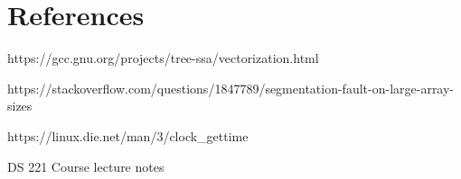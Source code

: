 \documentclass[11pt,a4paper,oneside]{article}
\begin{document}
    \section{References}
    
    \begin{list}{*}{}
    	\item https://gcc.gnu.org/projects/tree-ssa/vectorization.html
    	\item https://stackoverflow.com/questions/1847789/segmentation-fault-on-large-array-sizes
    	\item https://linux.die.net/man/3/clock\_gettime
    	\item DS 221 Course lecture notes
    \end{list}
\end{document}
